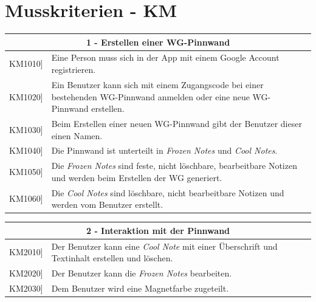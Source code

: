 \documentclass[a4paper]{scrreprt}
\begin{document}
    	\newpage
    
        \section{Musskriterien - KM}
        \begin{table}[h!]
        	\centering
        	\label{my-label}
        	\begin{tabular}{p{2cm}p{12cm}}
        		
        		\multicolumn{2}{c}{\textbf{1 - Erstellen einer WG-Pinnwand}} \\ \hline
        		\centering{[}KM1010{]} & Eine Person muss sich in der App mit einem Google Account registrieren.\\
        		\centering{[}KM1020{]}& Ein Benutzer kann sich mit einem Zugangscode bei einer bestehenden WG-Pinnwand anmelden oder eine neue WG-Pinnwand erstellen.                                 \\
        		\centering{[}KM1030{]}& Beim Erstellen einer neuen WG-Pinnwand gibt der Benutzer dieser einen Namen.\\ 
        		\centering{[}KM1040{]}& Die Pinnwand ist unterteilt in \textit{Frozen Notes} und \textit{Cool Notes}.\\ 
        		\centering{[}KM1050{]}& Die \textit{Frozen Notes} sind feste, nicht löschbare, bearbeitbare Notizen und werden beim Erstellen der WG generiert.\\ 
        		\centering{[}KM1060{]}& Die \textit{Cool Notes} sind löschbare, nicht bearbeitbare Notizen und werden vom Benutzer erstellt.\\ 
        		\hline
        	\end{tabular}
        \end{table}
    
    	\vspace{5mm}
    	
    	\begin{table}[h!]
    		\centering
    		\label{my-label}
    		\begin{tabular}{p{2cm}p{12cm}}
    			
    			\multicolumn{2}{c}{\textbf{2 - Interaktion mit der Pinnwand}} \\ \hline
    			\centering{[}KM2010{]} & Der Benutzer kann eine \textit{Cool Note} mit einer Überschrift und Textinhalt erstellen und löschen.\\
    			\centering{[}KM2020{]}& Der Benutzer kann die \textit{Frozen Notes} bearbeiten.                                 \\
    			\centering{[}KM2030{]}& Dem Benutzer wird eine Magnetfarbe zugeteilt.\\ 
    			
    			\hline
    		\end{tabular}
    	\end{table}
    
\end{document}
